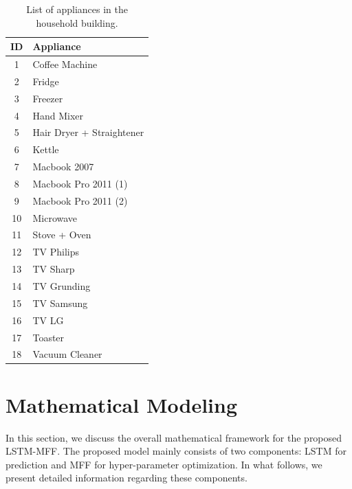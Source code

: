 \documentclass[journal]{IEEEtran}
\begin{document}
 

\begin{table}[htbp]
\centering
\caption{List of appliances in the household building. }
\label{tab:appliances}
\begin{tabular}{|c|l|}
\hline
\rowcolor[HTML]{C0C0C0}
\textbf{ID} & \textbf{Appliance} \\ \hline
1 & Coffee Machine\\
\hline
2 & Fridge  \\
\hline
3 & Freezer \\
\hline
4 & Hand Mixer \\
\hline
5 & Hair Dryer + Straightener\\
\hline
6 & Kettle \\
\hline
7 & Macbook 2007 \\
\hline
8 & Macbook Pro 2011 (1) \\
\hline
9 & Macbook Pro 2011 (2) \\
\hline
10 & Microwave \\
\hline
11 & Stove + Oven \\
\hline
12 & TV Philips \\
\hline
13 & TV Sharp \\
\hline
14 & TV Grunding \\
\hline
15 & TV Samsung \\
\hline
16 & TV LG \\
\hline
17 & Toaster \\
\hline
18 & Vacuum Cleaner\\
\hline

\end{tabular}

\end{table}













\section{Mathematical Modeling}\label{Mathematical Modeling}
In this section, we discuss the overall mathematical framework for the proposed LSTM-MFF. The proposed model mainly consists of two components: LSTM for prediction and MFF for hyper-parameter optimization. In what follows, we present detailed information regarding these components.
\end{document}
